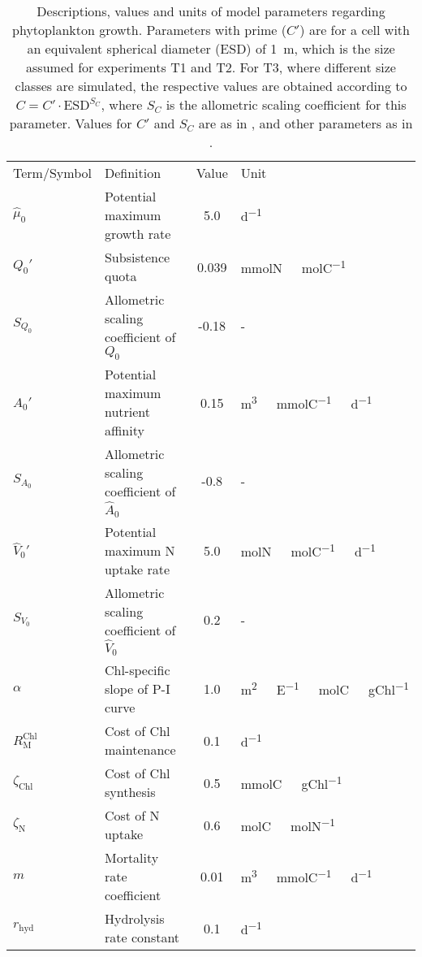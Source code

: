 \documentclass[gmd, manuscript]{copernicus}
\begin{document}
\begin{table*}[htb]
  \caption{ Descriptions, values and units of model parameters regarding phytoplankton growth. Parameters with prime ($C'$) are for a cell with an equivalent spherical diameter (ESD) of 1\unit{{\mu}m}, which is the size assumed for experiments T1 and T2. For T3, where different size classes are simulated, the respective values are obtained according to $C=C'\cdot \text{ESD}^{S_C}$, where $S_C$ is the allometric scaling coefficient for this parameter. Values for $C'$ and $S_C$ are as in \citet{Smith2016}, and other parameters as in \citet{Kerimoglu2021}.\label{T.pars}}
  \begin{tabular}{l l c l}
    \tophline
    Term/Symbol         & Definition                        & Value     & Unit\\
    \middlehline
    $\hat{\mu}_0$   & Potential maximum growth rate         & 5.0       & \unit{d^{-1}}\\
    $Q_0'$  & Subsistence quota                     & 0.039     & \unit{mmolN\ molC^{-1}}\\
    $S_{Q_0}$  & Allometric scaling coefficient of $Q_0$       & -0.18     & \unit{-}\\
    $\hat{A}_0'$     & Potential maximum nutrient affinity   & 0.15       & \unit{m^3\ mmolC^{-1}\ d^{-1}}\\
    $S_{A_0}$  & Allometric scaling coefficient of $\hat{A}_0$        & -0.8     & \unit{-}\\
    $\hat{V}_0'$     & Potential maximum N uptake rate       & 5.0       & \unit{molN\ molC^{-1}\ d^{-1}}\\
    $S_{V_0}$  & Allometric scaling coefficient of $\hat{V}_0$        & 0.2     & \unit{-}\\
    $\alpha$           & Chl-specific slope of P-I curve    & 1.0       & \unit{m^2\ E^{-1}\ molC\ gChl^{-1}}\\
    $R^{\text{Chl}}_{\text{M}}$     & Cost of Chl maintenance   & 0.1       & \unit{d^{-1}}\\
    $\zeta_{\text{Chl}}$   & Cost of Chl synthesis  & 0.5       & \unit{mmolC\ gChl^{-1}}\\
    $\zeta_{\text{N}}$     & Cost of N uptake               & 0.6       & \unit{molC\ molN^{-1}}\\
    $m$                & Mortality rate coefficient        & 0.01   & \unit{m^{3}\ mmolC^{-1}\ d^{-1}} \\
    $r_{\text{hyd}}$   & Hydrolysis rate constant          & 0.1   & \unit{d^{-1}} \\

\end{tabular}
\end{table*}
\end{document}
